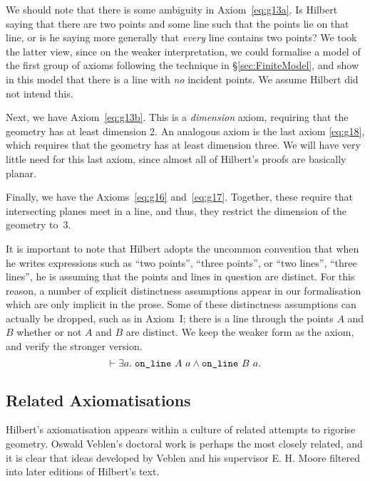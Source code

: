 \label{sec:DanglingPoints}
We should note that there is some ambiguity in Axiom~\ref{eq:g13a}. Is Hilbert saying that there are two points and some line such that the points lie on that line, or is he saying more generally that \emph{every} line contains two points? We took the latter view, since on the weaker interpretation, we could formalise a model of the first group of axioms following the technique in \S\ref{sec:FiniteModel}, and show in this model that there is a line with \emph{no} incident points. We assume Hilbert did not intend this.

Next, we have Axiom~\ref{eq:g13b}. This is a \emph{dimension} axiom, requiring that the geometry has at least dimension 2. An analogous axiom is the last axiom \eqref{eq:g18}, which requires that the geometry has at least dimension three. We will have very little need for this last axiom, since almost all of Hilbert's proofs are basically planar.

Finally, we have the Axioms~\ref{eq:g16} and~\ref{eq:g17}. Together, these require that intersecting planes meet in a line, and thus, they restrict the dimension of the geometry to~3.

It is important to note that Hilbert adopts the uncommon convention that when he writes expressions such as ``two points'', ``three points'', or ``two lines'', ``three lines'', he is assuming that the points and lines in question are distinct\label{sec:DistinctVars}. For this reason, a number of explicit distinctness assumptions appear in our formalisation which are only implicit in the prose. Some of these distinctness assumptions can actually be dropped, such as in Axiom~I; there is a line through the points $A$ and $B$ whether or not $A$ and $B$ are distinct. We keep the weaker form as the axiom, and verify the stronger version.
\begin{displaymath}
  \vdash \exists a.\; \texttt{on\_line}\ A\ a \wedge \texttt{on\_line}\ B\ a.
\end{displaymath}

\subsection{Related Axiomatisations}
Hilbert's axiomatisation appears within a culture of related attempts to rigorise geometry. Oswald Veblen's doctoral work \cite{Veblenphd} is perhaps the most closely related, and it is clear that ideas developed by Veblen and his supervisor E. H. Moore filtered into later editions of Hilbert's text.

